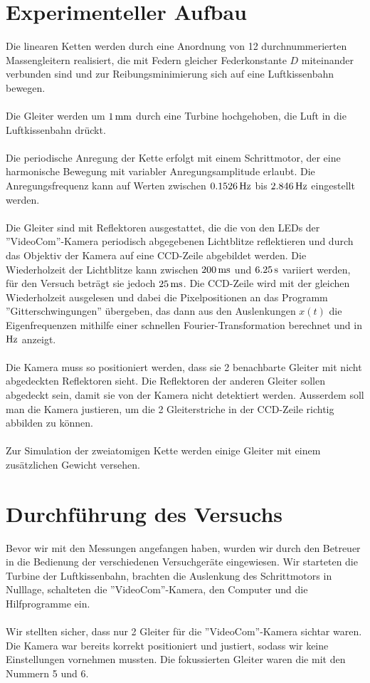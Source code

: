 \documentclass[a4paper,titlepage]{scrartcl}
\numberwithin{equation}{section}
\begin{document}
\section{Experimenteller Aufbau}
Die linearen Ketten werden durch eine Anordnung von 12 durchnummerierten Massengleitern realisiert, die mit Federn gleicher Federkonstante $D$ miteinander verbunden sind und zur Reibungsminimierung sich auf eine Luftkissenbahn bewegen.\\ \\
Die Gleiter werden um $\unit[1]{mm}$ durch eine Turbine hochgehoben, die Luft in die Luftkissenbahn drückt.\\ \\
Die periodische Anregung der Kette erfolgt mit einem Schrittmotor, der eine harmonische Bewegung mit variabler Anregungsamplitude erlaubt. Die Anregungsfrequenz kann auf Werten zwischen $\unit[0.1526]{Hz}$ bis $\unit[2.846]{Hz}$ eingestellt werden.\\ \\
Die Gleiter sind mit Reflektoren ausgestattet, die die von den LEDs der ''VideoCom''-Kamera periodisch abgegebenen Lichtblitze reflektieren und durch das Objektiv der Kamera auf eine CCD-Zeile abgebildet werden. Die Wiederholzeit der Lichtblitze kann zwischen $\unit[200]{ms}$ und $\unit[6.25]{s}$ variiert werden, für den Versuch beträgt sie jedoch $\unit[25]{ms}$. Die CCD-Zeile wird mit der gleichen Wiederholzeit ausgelesen und dabei die Pixelpositionen an das Programm ''Gitterschwingungen'' übergeben, das dann aus den Auslenkungen $x(t)$ die Eigenfrequenzen mithilfe einer schnellen Fourier-Transformation berechnet und in $\unit[]{Hz}$ anzeigt.\\ \\
Die Kamera muss so positioniert werden, dass sie 2 benachbarte Gleiter mit nicht abgedeckten Reflektoren sieht. Die Reflektoren der anderen Gleiter sollen abgedeckt sein, damit sie von der Kamera nicht detektiert werden. Ausserdem soll man die Kamera justieren, um die 2 Gleiterstriche in der CCD-Zeile richtig abbilden zu können.\\ \\
Zur Simulation der zweiatomigen Kette werden einige Gleiter mit einem zusätzlichen Gewicht versehen.
\section{Durchführung des Versuchs}
Bevor wir mit den Messungen angefangen haben, wurden wir durch den Betreuer in die Bedienung der verschiedenen Versuchgeräte eingewiesen. Wir starteten die Turbine der Luftkissenbahn, brachten die Auslenkung des Schrittmotors in Nulllage, schalteten die ''VideoCom''-Kamera, den Computer und die Hilfprogramme ein.\\ \\
Wir stellten sicher, dass nur 2 Gleiter für die ''VideoCom''-Kamera sichtar waren. Die Kamera war bereits korrekt positioniert und justiert, sodass wir keine Einstellungen vornehmen mussten. Die fokussierten Gleiter waren die mit den Nummern 5 und 6.
\end{document}
